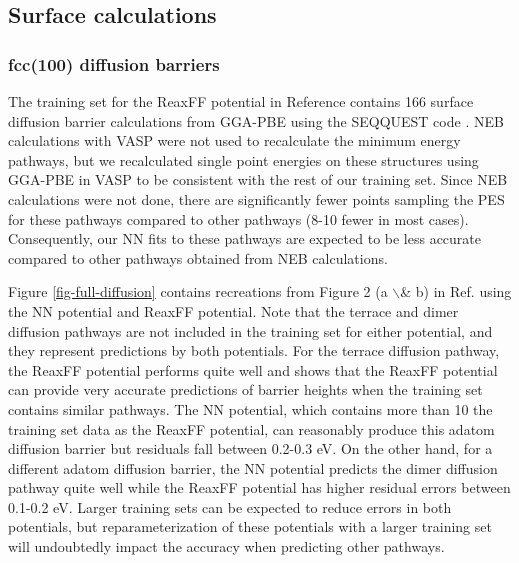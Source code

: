 \documentclass[12pt]{cmuthesis}
\begin{document}
\subsection{Surface calculations}
\label{sec:org5f5ea72}
\subsubsection{fcc(100) diffusion barriers}
\label{sec:org8de1215}
The training set for the ReaxFF potential in Reference  contains 166 surface diffusion barrier calculations from GGA-PBE using the SEQQUEST code \cite{schultz-2002-seqques}. NEB calculations with VASP were not used to recalculate the minimum energy pathways, but we recalculated single point energies on these structures using GGA-PBE in VASP to be consistent with the rest of our training set. Since NEB calculations were not done, there are significantly fewer points sampling the PES for these pathways compared to other pathways (8-10\texttimes{} fewer in most cases). Consequently, our NN fits to these pathways are expected to be less accurate compared to other pathways obtained from NEB calculations.

Figure \ref{fig-full-diffusion} contains recreations from Figure 2 (a $\backslash$& b) in Ref.  using the NN potential and ReaxFF potential. Note that the terrace and dimer diffusion pathways are not included in the training set for either potential, and they represent predictions by both potentials. For the terrace diffusion pathway, the ReaxFF potential performs quite well and shows that the ReaxFF potential can provide very accurate predictions of barrier heights when the training set contains similar pathways. The NN potential, which contains more than 10\texttimes{} the training set data as the ReaxFF potential, can reasonably produce this adatom diffusion barrier but residuals fall between 0.2-0.3 eV. On the other hand, for a different adatom diffusion barrier, the NN potential predicts the dimer diffusion pathway quite well while the ReaxFF potential has higher residual errors between 0.1-0.2 eV. Larger training sets can be expected to reduce errors in both potentials, but reparameterization of these potentials with a larger training set will undoubtedly impact the accuracy when predicting other pathways.
\end{document}
